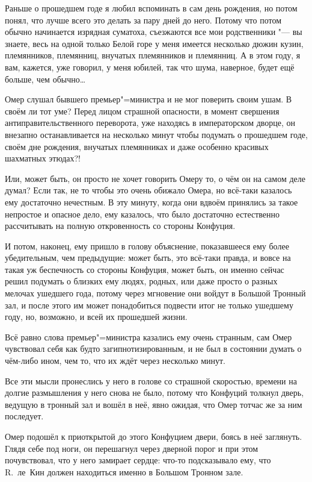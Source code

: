 Раньше о прошедшем годе я любил вспоминать в сам день рождения, но потом понял,
что лучше всего это делать за пару дней до него.
Потому что потом обычно начинается изрядная суматоха, съезжаются все мои
родственники "--- вы знаете, весь на одной только Белой горе у меня имеется
несколько дюжин кузин, племянников, племянниц, внучатых племянников и племянниц.
А в этом году, я вам, кажется, уже говорил, у меня юбилей, так что шума,
наверное, будет ещё больше, чем обычно\ldots

Омер слушал бывшего премьер"=министра и не мог поверить своим ушам.
В своём ли тот уме?
Перед лицом страшной опасности, в момент свершения антиправительственного
переворота, уже находясь в императорском дворце, он внезапно останавливается на
несколько минут чтобы подумать о прошедшем годе, своём дне рождения, внучатых
племянниках и даже особенно красивых шахматных этюдах?!

Или, может быть, он просто не хочет говорить Омеру то, о чём он на самом деле
думал?
Если так, не то чтобы это очень обижало Омера, но всё-таки казалось ему
достаточно нечестным.
В эту минуту, когда они вдвоём принялись за такое непростое и опасное дело, ему
казалось, что было достаточно естественно рассчитывать на полную откровенность
со стороны Конфуция.

И потом, наконец, ему пришло в голову объяснение, показавшееся ему более
убедительным, чем предыдущие: может быть, это всё-таки правда, и вовсе на такая
уж беспечность со стороны Конфуция, может быть, он именно сейчас решил подумать
о близких ему людях, родных, или даже просто о разных мелочах ушедшего года,
потому через мгновение они войдут в Большой Тронный зал, и после этого им может
понадобиться подвести итог не только ушедшему году, но, возможно, и всей их
прошедшей жизни.

Всё равно слова премьер"=министра казались ему очень странным, сам Омер
чувствовал себя как будто загипнотизированным, и не был в состоянии думать о
чём-либо ином, чем то, что их ждёт через несколько минут.

Все эти мысли пронеслись у него в голове со страшной скоростью, времени на
долгие размышления у него снова не было, потому что Конфуций толкнул дверь,
ведущую в тронный зал и вошёл в неё, явно ожидая, что Омер тотчас же за ним
последует.

Омер подошёл к приоткрытой до этого Конфуцием двери, боясь в неё заглянуть.
Глядя себе под ноги, он перешагнул через дверной порог и при этом почувствовал,
что у него замирает сердце: что-то подсказывало ему, что R.~ле~Кин должен
находиться именно в Большом Тронном зале.

